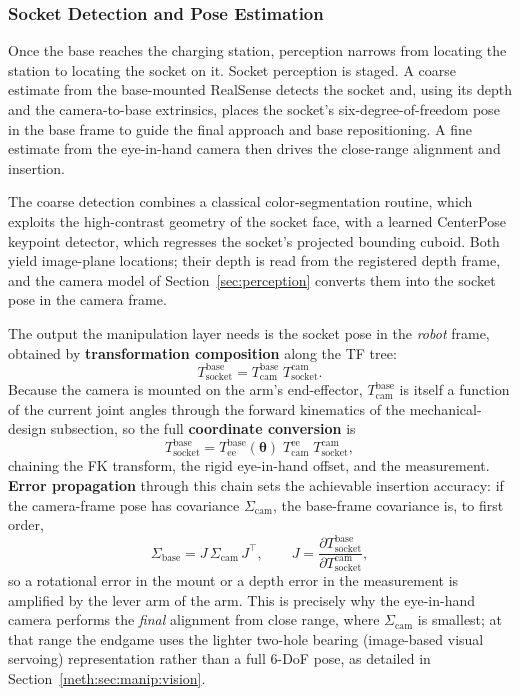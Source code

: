 \subsubsection{Socket Detection and Pose Estimation}\label{sec:socket}

Once the base reaches the charging station, perception narrows from locating the station to locating the socket on it. Socket perception is staged. A coarse estimate from the base-mounted RealSense detects the socket and, using its depth and the camera-to-base extrinsics, places the socket's six-degree-of-freedom pose in the base frame to guide the final approach and base repositioning. A fine estimate from the eye-in-hand camera then drives the close-range alignment and insertion.

The coarse detection combines a classical color-segmentation routine, which exploits the high-contrast geometry of the socket face, with a learned CenterPose keypoint detector, which regresses the socket's projected bounding cuboid. Both yield image-plane locations; their depth is read from the registered depth frame, and the camera model of Section~\ref{sec:perception} converts them into the socket pose in the camera frame.

The output the manipulation layer needs is the socket pose in the \emph{robot} frame, obtained by \textbf{transformation composition} along the TF tree:
$$
T^{\text{base}}_{\text{socket}} = T^{\text{base}}_{\text{cam}}\;T^{\text{cam}}_{\text{socket}}.
$$
Because the camera is mounted on the arm's end-effector, $T^{\text{base}}_{\text{cam}}$ is itself a function of the current joint angles through the forward kinematics of the mechanical-design subsection, so the full \textbf{coordinate conversion} is
$$
T^{\text{base}}_{\text{socket}} = T^{\text{base}}_{\text{ee}}(\boldsymbol{\theta})\;T^{\text{ee}}_{\text{cam}}\;T^{\text{cam}}_{\text{socket}},
$$
chaining the FK transform, the rigid eye-in-hand offset, and the measurement. \textbf{Error propagation} through this chain sets the achievable insertion accuracy: if the camera-frame pose has covariance $\Sigma_{\text{cam}}$, the base-frame covariance is, to first order,
$$
\Sigma_{\text{base}} = J\,\Sigma_{\text{cam}}\,J^\top,\qquad J=\frac{\partial T^{\text{base}}_{\text{socket}}}{\partial T^{\text{cam}}_{\text{socket}}},
$$
so a rotational error in the mount or a depth error in the measurement is amplified by the lever arm of the arm. This is precisely why the eye-in-hand camera performs the \emph{final} alignment from close range, where $\Sigma_{\text{cam}}$ is smallest; at that range the endgame uses the lighter two-hole bearing (image-based visual servoing) representation rather than a full 6-DoF pose, as detailed in Section~\ref{meth:sec:manip:vision}.

